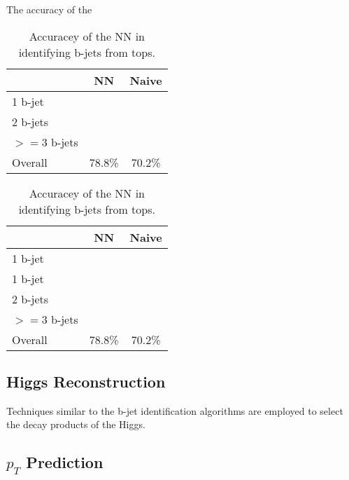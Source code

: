 The accuracy of the 

\begin{table}[h]
\centering
\caption{Accuracey of the NN in identifying b-jets from tops.}

\begin{tabular}{l|c|c}
\hline
\hline\hline
& NN & Naive \\
\hline
1 b-jet & & \\
2 b-jets & & \\
$>=$3 b-jets & & \\
\hline
Overall & 78.8\% & 70.2\% \\
\hline\hline
\end{tabular}

\begin{tabular}{l|c|c}
\hline
\hline\hline
& NN & Naive \\
\hline
1 b-jet & & \\
1 b-jet & & \\
2 b-jets & & \\                                                                                                            
$>=$3 b-jets & & \\ 
\hline
Overall & 78.8\% & 70.2\% \\
\hline\hline
\end{tabular}

\label{tab:topMatchAcc}
\end{table}





\subsection{Higgs Reconstruction}
\label{sec:higgsID}

Techniques similar to the b-jet identification algorithms are employed to select the decay products of the Higgs. 


\subsection{$p_T$ Prediction}
\label{sec:ptReco}

